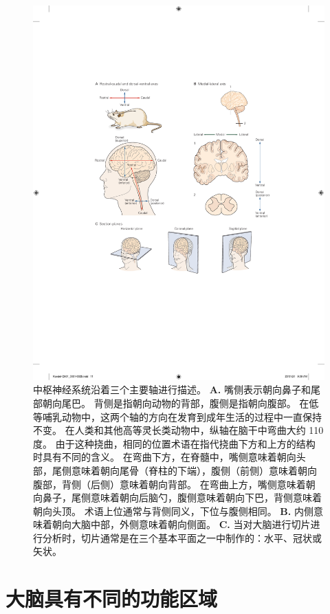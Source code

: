 \begin{figure}[htbp]
	\centering
	\includegraphics[width=0.95\linewidth]{chap01/fig_1_2}
	\caption{中枢神经系统沿着三个主要轴进行描述\cite{martin2012neuroanatomy}。 
		\textbf{A.} 嘴侧表示朝向鼻子和尾部朝向尾巴。
		背侧是指朝向动物的背部，腹侧是指朝向腹部。
		在低等哺乳动物中，这两个轴的方向在发育到成年生活的过程中一直保持不变。
		在人类和其他高等灵长类动物中，纵轴在脑干中弯曲大约 110 度。
		由于这种挠曲，相同的位置术语在指代挠曲下方和上方的结构时具有不同的含义。
		在弯曲下方，在脊髓中，嘴侧意味着朝向头部，尾侧意味着朝向尾骨（脊柱的下端），腹侧（前侧）意味着朝向腹部，背侧（后侧）意味着朝向背部。
		在弯曲上方，嘴侧意味着朝向鼻子，尾侧意味着朝向后脑勺，腹侧意味着朝向下巴，背侧意味着朝向头顶。
		术语上位通常与背侧同义，下位与腹侧相同。
		\textbf{B.} 内侧意味着朝向大脑中部，外侧意味着朝向侧面。
		\textbf{C.} 当对大脑进行切片进行分析时，切片通常是在三个基本平面之一中制作的：水平、冠状或矢状。}
	\label{fig:1_2}
\end{figure}



\section{大脑具有不同的功能区域}

